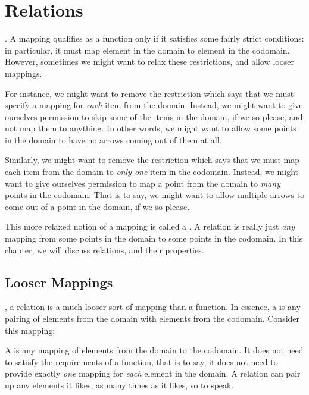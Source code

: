 \documentclass[../../../main.tex]{subfiles}
\begin{document}
\chapter{Relations}
\label{ch:relations}

. A mapping qualifies as a function only if it satisfies some fairly strict conditions: in particular, it must map  element in the domain to  element in the codomain. However, sometimes we might want to relax these restrictions, and allow looser mappings.

For instance, we might want to remove the restriction which says that we must specify a mapping for \emph{each} item from the domain. Instead, we might want to give ourselves permission to skip some of the items in the domain, if we so please, and not map them to anything. In other words, we might want to allow some points in the domain to have no arrows coming out of them at all.

Similarly, we might want to remove the restriction which says that we must map each item from the domain to \emph{only one} item in the codomain. Instead, we might want to give ourselves permission to map a point from the domain to \emph{many} points in the codomain. That is to say, we might want to allow multiple arrows to come out of a point in the domain, if we so please.

This more relaxed notion of a mapping is called a . A relation is really just \emph{any} mapping from some points in the domain to some points in the codomain. In this chapter, we will discuss relations, and their properties.


\section{Looser Mappings}

, a relation is a much looser sort of mapping than a function. In essence, a  is any pairing of elements from the domain with elements from the codomain. Consider this mapping:

\begin{terminology}
  A  is any mapping of elements from the domain to the codomain. It does not need to satisfy the requirements of a function, that is to say, it does not need to provide exactly \emph{one} mapping for \emph{each} element in the domain. A relation can pair up any elements it likes, as many times as it likes, so to speak.
\end{terminology}
\end{document}

